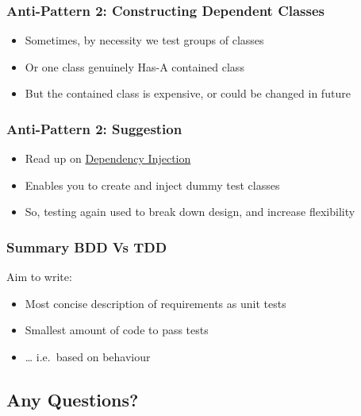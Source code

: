 \subsubsection{Anti-Pattern 2: Constructing Dependent
Classes}\label{anti-pattern-2-constructing-dependent-classes}

\begin{itemize}
\itemsep1pt\parskip0pt
\item
  Sometimes, by necessity we test groups of classes
\item
  Or one class genuinely Has-A contained class
\item
  But the contained class is expensive, or could be changed in future
\end{itemize}

\subsubsection{Anti-Pattern 2:
Suggestion}\label{anti-pattern-2-suggestion}

\begin{itemize}
\itemsep1pt\parskip0pt
\item
  Read up on
  \href{https://martinfowler.com/articles/injection.html}{Dependency
  Injection}
\item
  Enables you to create and inject dummy test classes
\item
  So, testing again used to break down design, and increase flexibility
\end{itemize}

\subsubsection{Summary BDD Vs TDD}\label{summary-bdd-vs-tdd}

Aim to write:

\begin{itemize}
\itemsep1pt\parskip0pt
\item
  Most concise description of requirements as unit tests
\item
  Smallest amount of code to pass tests
\item
  \ldots{} i.e.~based on behaviour
\end{itemize}

\subsection{Any Questions?}\label{any-questions}

